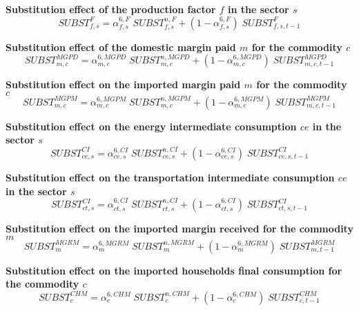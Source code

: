 \documentclass[12pt]{article}
\numberwithin{equation}{section}
\begin{document}
\noindent\textbf{Substitution effect of the production factor $f$ in the sector $s$} \\
\begin{dmath}
SUBST^{F}_{f, s} = \alpha^{{6},F}_{f, s} \; SUBST^{n,F}_{f, s} + \left( 1 - \alpha^{{6},F}_{f, s} \right) \; SUBST^{F}_{f, s, t-1}
\end{dmath}

\noindent\textbf{Substitution effect of the domestic margin paid $m$ for the commodity $c$} \\
\begin{dmath}
SUBST^{MGPD}_{m, c} = \alpha^{{6},MGPD}_{m, c} \; SUBST^{n,MGPD}_{m, c} + \left( 1 - \alpha^{{6},MGPD}_{m, c} \right) \; SUBST^{MGPD}_{m, c, t-1}
\end{dmath}

\noindent\textbf{Substitution effect on the imported margin paid $m$ for the commodity $c$} \\
\begin{dmath}
SUBST^{MGPM}_{m, c} = \alpha^{{6},MGPM}_{m, c} \; SUBST^{n,MGPM}_{m, c} + \left( 1 - \alpha^{{6},MGPM}_{m, c} \right) \; SUBST^{MGPM}_{m, c, t-1}
\end{dmath}

\noindent\textbf{Substitution effect on the energy intermediate consumption $ce$ in the sector $s$} \\
\begin{dmath}
SUBST^{CI}_{ce, s} = \alpha^{{6},CI}_{ce, s} \; SUBST^{n,CI}_{ce, s} + \left( 1 - \alpha^{{6},CI}_{ce, s} \right) \; SUBST^{CI}_{ce, s, t-1}
\end{dmath}

\noindent\textbf{Substitution effect on the transportation intermediate consumption $ce$ in the sector $s$} \\
\begin{dmath}
SUBST^{CI}_{ct, s} = \alpha^{{6},CI}_{ct, s} \; SUBST^{n,CI}_{ct, s} + \left( 1 - \alpha^{{6},CI}_{ct, s} \right) \; SUBST^{CI}_{ct, s, t-1}
\end{dmath}

\noindent\textbf{Substitution effect on the imported margin received for the commodity $m$} \\
\begin{dmath}
SUBST^{MGRM}_{m} = \alpha^{{6},MGRM}_{m} \; SUBST^{n,MGRM}_{m} + \left( 1 - \alpha^{{6},MGRM}_{m} \right) \; SUBST^{MGRM}_{m, t-1}
\end{dmath}

\noindent\textbf{Substitution effect on the imported households final consumption for the commodity $c$} \\
\begin{dmath}
SUBST^{CHM}_{c} = \alpha^{{6},CHM}_{c} \; SUBST^{n,CHM}_{c} + \left( 1 - \alpha^{{6},CHM}_{c} \right) \; SUBST^{CHM}_{c, t-1}
\end{dmath}
\end{document}
